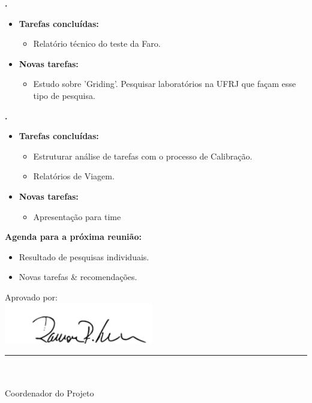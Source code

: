 	
	  \textbf{\elael.} 
	\begin{itemize}
		\item \textbf{Tarefas concluídas:}
			\begin{itemize}    
				\item Relatório técnico do teste da Faro.
			\end{itemize}
		
		\item \textbf{Novas tarefas:}
			\begin{itemize} 
			    \item Estudo sobre 'Griding'. Pesquisar laboratórios na UFRJ que façam esse
				tipo de pesquisa.
			\end{itemize}
	\end{itemize}			
			
			
   \textbf{\julia.} 
	\begin{itemize}
		\item \textbf{Tarefas concluídas:}
			\begin{itemize}    
				\item Estruturar análise de tarefas com o processo de Calibração.
				\item Relatórios de Viagem.
			\end{itemize}
		
		\item \textbf{Novas tarefas:}
			\begin{itemize} 
			    \item Apresentação para time
			\end{itemize}
	\end{itemize}		



\textbf{Agenda para a próxima reunião:}
  \begin{itemize}
    \item Resultado de pesquisas individuais.
    \item Novas tarefas \& recomendações.
  \end{itemize}


\vspace{5mm}%
\parbox[t]{70mm}{
  Aprovado por: \\[5mm]
  \centering
  \includegraphics[width=65mm]{figs/logo/assinatura-ramon.png} \\[-4mm]
  \rule[2mm]{70mm}{0.1mm} \\
  \ramon \\[1mm]
  Coordenador do Projeto \\
}

\fim
